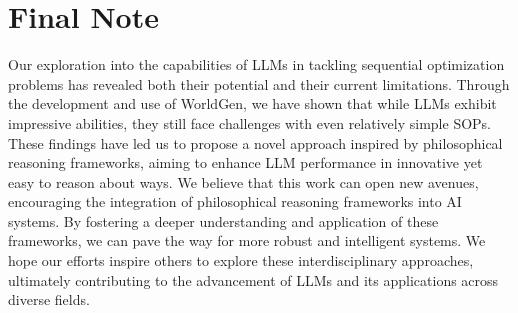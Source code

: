 \section{Final Note}
Our exploration into the capabilities of LLMs in tackling sequential optimization problems has revealed both their potential and their current limitations. Through the development and use of WorldGen, we have shown that while LLMs exhibit impressive abilities, they still face challenges with even relatively simple SOPs. These findings have led us to propose a novel approach inspired by philosophical reasoning frameworks, aiming to enhance LLM performance in innovative yet easy to reason about ways.
We believe that this work can open new avenues, encouraging the integration of philosophical reasoning frameworks into AI systems. By fostering a deeper understanding and application of these frameworks, we can pave the way for more robust and intelligent systems. We hope our efforts inspire others to explore these interdisciplinary approaches, ultimately contributing to the advancement of LLMs and its applications across diverse fields.


